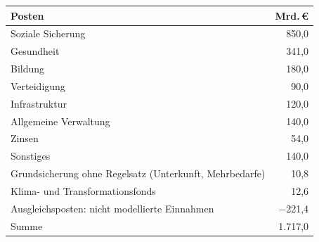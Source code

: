 \begin{tabular}{@{}lr@{}}
\toprule
Posten & Mrd.\,\euro{} \\
\midrule
Soziale Sicherung & 850,0 \\
Gesundheit & 341,0 \\
Bildung & 180,0 \\
Verteidigung & 90,0 \\
Infrastruktur & 120,0 \\
Allgemeine Verwaltung & 140,0 \\
Zinsen & 54,0 \\
Sonstiges & 140,0 \\
Grundsicherung ohne Regelsatz (Unterkunft, Mehrbedarfe) & 10,8 \\
Klima- und Transformationsfonds & 12,6 \\
Ausgleichsposten: nicht modellierte Einnahmen & $-$221,4 \\
\midrule
Summe & 1.717,0 \\
\bottomrule
\end{tabular}
